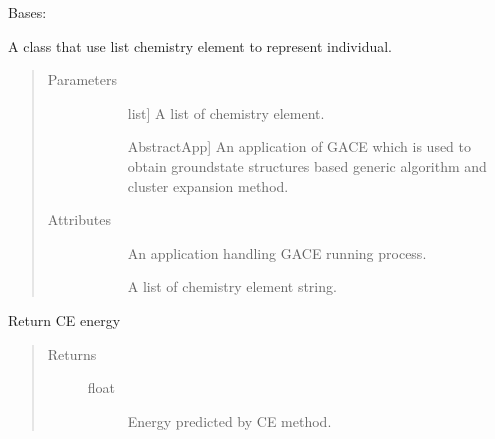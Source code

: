 \documentclass[letterpaper,10pt,english]{sphinxmanual}
\begin{document}

\begin{fulllineitems}
\label{\detokenize{pygace:pygace.general_gace.GeneralEleIndv}}
\sphinxAtStartPar
Bases: {\hyperref[\detokenize{pygace:pygace.utility.EleIndv}]{}}

\sphinxAtStartPar
A class that use list chemistry element to represent individual.
\begin{quote}\begin{description}
\item[{Parameters}] \leavevmode\begin{description}
\item[{}] \leavevmode{[}list{]}
\sphinxAtStartPar
A list of chemistry element.

\item[{}] \leavevmode{[}AbstractApp{]}
\sphinxAtStartPar
An application of GACE which is used to obtain ground\sphinxhyphen{}state
structures based generic algorithm and cluster expansion method.

\end{description}

\item[{Attributes}] \leavevmode\begin{description}
\item[{}] \leavevmode
\sphinxAtStartPar
An application handling GACE running process.

\item[{}] \leavevmode
\sphinxAtStartPar
A list of chemistry element string.

\end{description}

\end{description}\end{quote}

\begin{fulllineitems}
\label{\detokenize{pygace:pygace.general_gace.GeneralEleIndv.ce_energy}}
\sphinxAtStartPar
Return CE energy
\begin{quote}\begin{description}
\item[{Returns}] \leavevmode\begin{description}
\item[{float}] \leavevmode
\sphinxAtStartPar
Energy predicted by CE method.


\end{description}
\end{description}
\end{quote}
\end{fulllineitems}
\end{fulllineitems}
\end{document}
